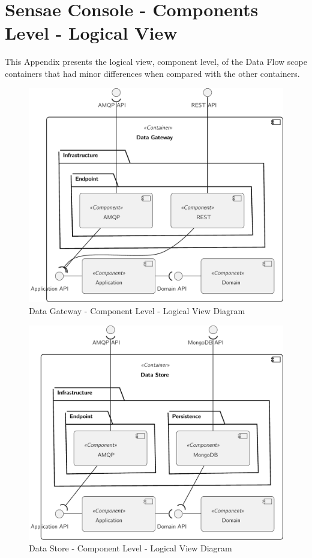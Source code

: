 \chapter{Sensae Console - Components Level - Logical View}
\label{AppendixC}

This Appendix presents the logical view, component level, of the Data Flow scope containers that had minor differences when compared with the other containers.

\begin{figure}[H]
   \centering
   \includegraphics[page=1,width=0.6\columnwidth]{assets/diagrams/design/architectural/level3/logical/data-gateway.pdf}
   \caption[Data Gateway - Component Level - Logical View Diagram]{Data Gateway - Component Level - Logical View Diagram}
   \label{fig:AppendixC:gateway}
\end{figure}

\begin{figure}[H]
   \centering
   \includegraphics[page=1,width=0.6\columnwidth]{assets/diagrams/design/architectural/level3/logical/data-store.pdf}
   \caption[Data Store - Component Level - Logical View Diagram]{Data Store - Component Level - Logical View Diagram}
   \label{fig:AppendixC:store}
\end{figure}

